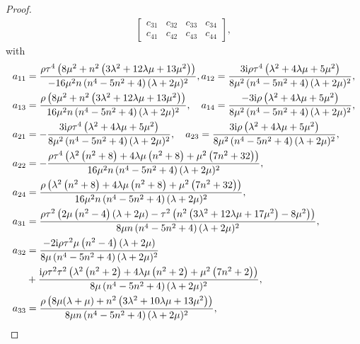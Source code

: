 \documentclass[10pt,a4paper]{amsart}
\begin{document}
\begin{proof}
\begin{align}
\begin{bmatrix}
			c_{31} & c_{32} & c_{33}& c_{34}\\
			c_{41} & c_{42} & c_{43}& c_{44}
		\end{bmatrix},
	\end{align}
	with	
	\begin{align}	
		a_{11}&=\frac{\rho   \tau ^4 \left(8 \mu ^2+n^2 \left(3 \lambda ^2+12 \lambda  \mu +13 \mu ^2\right)\right)}{-16 \mu ^2 n \left(n^4-5 n^2+4\right) (\lambda +2 \mu )^2},a_{12}=\frac{3 \mathrm{i} \rho  \tau ^4 \left(\lambda ^2+4 \lambda  \mu +5 \mu ^2\right)}{8 \mu ^2 \left(n^4-5 n^2+4\right) (\lambda +2 \mu )^2},\notag\\
		a_{13}&=\frac{\rho   \left(8 \mu ^2+n^2 \left(3 \lambda ^2+12 \lambda  \mu +13 \mu ^2\right)\right)}{16 \mu ^2 n \left(n^4-5 n^2+4\right) (\lambda +2 \mu )^2},\quad a_{14}=\frac{-3 \mathrm{i} \rho   \left(\lambda ^2+4 \lambda  \mu +5 \mu ^2\right)}{8 \mu ^2 \left(n^4-5 n^2+4\right) (\lambda +2 \mu )^2},\notag\\	
		a_{21}&=-\frac{3 \mathrm{i} \rho   \tau ^4 \left(\lambda ^2+4 \lambda  \mu +5 \mu ^2\right)}{8 \mu ^2 \left(n^4-5 n^2+4\right) (\lambda +2 \mu )^2},\quad a_{23}=\frac{3 \mathrm{i} \rho   \left(\lambda ^2+4 \lambda  \mu +5 \mu ^2\right)}{8 \mu ^2 \left(n^4-5 n^2+4\right) (\lambda +2 \mu )^2},\notag\\
		a_{22}&=-\frac{\rho  \tau ^4 \left(\lambda ^2 \left(n^2+8\right)+4 \lambda  \mu  \left(n^2+8\right)+\mu ^2 \left(7 n^2+32\right)\right)}{16 \mu ^2 n \left(n^4-5 n^2+4\right) (\lambda +2 \mu )^2},\notag\\
		a_{24}&=\frac{\rho   \left(\lambda ^2 \left(n^2+8\right)+4 \lambda  \mu  \left(n^2+8\right)+\mu ^2 \left(7 n^2+32\right)\right)}{16 \mu ^2 n \left(n^4-5 n^2+4\right) (\lambda +2 \mu )^2},\notag\\
		a_{31}&=\frac{\rho   \tau ^2 \left(2 \mu  \left(n^2-4\right) (\lambda +2 \mu )-\tau ^2 \left(n^2 \left(3 \lambda ^2+12 \lambda  \mu +17 \mu ^2\right)-8 \mu ^2\right)\right)}{8 \mu  n \left(n^4-5 n^2+4\right) (\lambda +2 \mu )^2},\notag\\
		a_{32}&=\frac{- 2 \mathrm{i} \rho   \tau ^2\mu  \left(n^2-4\right) (\lambda +2 \mu )}{8 \mu  \left(n^4-5 n^2+4\right) (\lambda +2 \mu )^2}\notag\\
		&+\frac{ \mathrm{i} \rho   \tau ^2\tau ^2 \left(\lambda ^2 \left(n^2+2\right)+4 \lambda  \mu  \left(n^2+2\right)+\mu ^2 \left(7 n^2+2\right)\right)}{8 \mu  \left(n^4-5 n^2+4\right) (\lambda +2 \mu )^2},\notag\\
		a_{33}&=\frac{\rho   \left(8 \mu  (\lambda +\mu )+n^2 \left(3 \lambda ^2+10 \lambda  \mu +13 \mu ^2\right)\right)}{8 \mu  n \left(n^4-5 n^2+4\right) (\lambda +2 \mu )^2},\notag\\

\end{align}
\end{proof}
\end{document}
